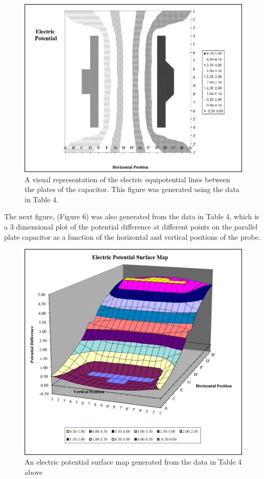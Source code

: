 \documentclass[letterpaper]{article}
\begin{document}
\begin{figure}[H]
  \centering
  \includegraphics[width=.9\textwidth]{chart2.png}
  \caption{A visual representation of the electric equipotential lines between the plates of the capacitor. This figure was generated using the data in Table 4.}
\end{figure}
\vspace{2cm}
The next figure, (Figure 6) was also generated from the data in Table 4, which is a 3
dimensional plot of the potential difference at different points on the parallel plate capacitor
as a function of the horizontal and vertical positions of the probe.
\begin{figure}[H]
  \centering
  \includegraphics[width=\textwidth]{chart3.png}
  \caption{An electric potential surface map generated from the data in Table 4 above}
\end{figure}
\end{document}
